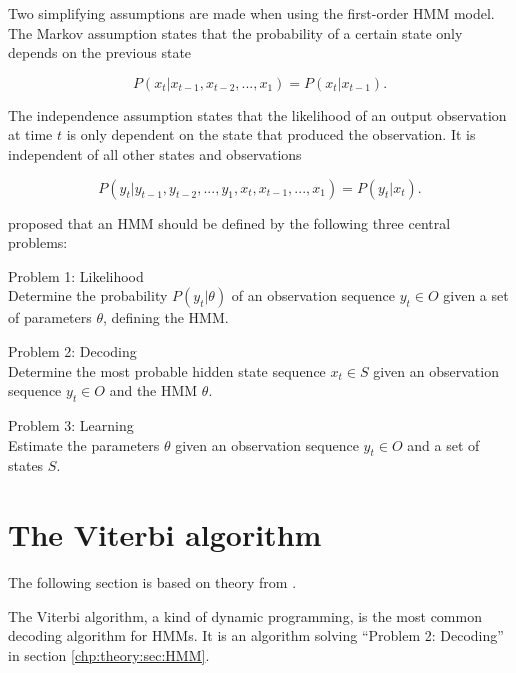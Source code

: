 Two simplifying assumptions are made when using the first-order \ac{HMM} model. The Markov assumption states that the probability of a certain state only depends on the previous state

\begin{equation}
    P(x_t | x_{t-1}, x_{t-2}, ..., x_1) = P(x_t | x_{t-1}).
\end{equation}

The independence assumption states that the likelihood of an output observation at time $t$ is only dependent on the state that produced the observation. It is independent of all other states and observations

\begin{equation}
    P(y_t | y_{t-1}, y_{t-2}, ..., y_1, x_t, x_{t-1}, ..., x_1) = P(y_t | x_t).
\end{equation}


\cite{Rabiner} proposed that an \ac{HMM} should be defined by the following three central problems:

\newpage
Problem 1: Likelihood\\
Determine the probability $P(y_t | \theta)$ of an observation sequence $y_t \in O$ given a set of parameters $\theta$, defining the \ac{HMM}. 

Problem 2: Decoding\\
Determine the most probable hidden state sequence $x_t \in S$ given an observation sequence $y_t \in O$ and the \ac{HMM} $\theta$. 

Problem 3: Learning\\
Estimate the parameters $\theta$ given an observation sequence $y_t \in O$ and a set of states $S$.





\section{The Viterbi algorithm} %
The following section is based on theory from \citep{HMMstanford}\citep{viterbi}.


The Viterbi algorithm, a kind of dynamic programming, is the most common decoding algorithm for \ac{HMM}s. It is an algorithm solving ``Problem 2: Decoding'' in section \ref{chp:theory:sec:HMM}.



